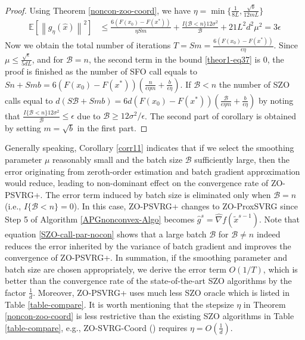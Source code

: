 \documentclass{article}
\newcommand*{\E}{\mathbb{E}}
\newcommand{\norm}[1]{\left\lVert#1\right\rVert}
\theoremstyle{definition}
\theoremstyle{remark}
\begin{document}
\begin{proof}
Using Theorem \ref{noncon-zoo-coord}, we have $\eta = \min\{\frac{1}{8L}, \frac{\sqrt{b}}{12mL}\}$
\begin{align}
\E[\norm{g_{\eta}(\hat{x})}^2] & \leq \frac{6\left(F(x_0) - F({x}^*)\right)}{\eta Sm} + \frac{I\{\mathcal{B} < n\}12 \sigma ^2}{\mathcal{B}}+21{L^2 d^2 \mu^2} = 3\epsilon\label{theor1-eq37}
 \end{align} 
 Now we obtain the total number of iterations   $T = Sm = \frac{6\left(F(x_0) - F({x}^*)\right)}{\epsilon\eta}$. Since $\mu \leq \frac{\sqrt{\epsilon}}{5{dL}}$, and for $\mathcal{B} = n$, the second term in the bound \eqref{theor1-eq37} is $0$, the proof is finished as the number of SFO call equals to $Sn+Smb = 6 \left(F(x_0) - F({x}^*)\right) (\frac{n}{\epsilon\eta m}+\frac{b}{\epsilon\eta})$. If  $\mathcal{B} < n$ the number of SZO calls equal to  $d(S\mathcal{B}+Smb) = 6d \left(F(x_0) - F({x}^*)\right) (\frac{\mathcal{\mathcal{B}}}{\epsilon\eta m}+\frac{b}{\epsilon\eta})$ by noting that $\frac{I\{\mathcal{B} < n\}12\sigma^2}{\mathcal{B}} \leq \epsilon$ due to $\mathcal{B} \geq 12\sigma^2 /\epsilon$. The second part of corollary is obtained by setting $m = \sqrt{b}$ in the first part.
\end{proof}
Generally speaking, Corollary \ref{corr11} indicates  that if we select the smoothing parameter $\mu$ reasonably small and the batch size $\mathcal{B}$ sufficiently large, then the error originating from zeroth-order estimation and batch gradient approximation would reduce, leading to non-dominant effect on the convergence rate of ZO-PSVRG+.
The error term induced by batch size  is eliminated only when $\mathcal{B} = n$  (i.e., $I\{\mathcal{B} < n\} = 0$). In
this case, ZO-PSVRG+ changes to ZO-ProxSVRG since Step 5 of Algorithm \ref{APGnonconvex-Algo} becomes $\hat{g}^s = \hat{\nabla} f(\tilde{x}^{s-1})$. Note that equation \eqref{SZO-call-par-nocon} shows that a large batch $\mathcal{B}$  for $\mathcal{B} \neq n$ indeed reduces the error inherited by the variance of batch gradient and improves the convergence of ZO-PSVRG+.  
In summation, if the smoothing parameter and batch size are chosen appropriately, we derive the error term $O(1/T)$, which is better than the convergence rate of the state-of-the-art SZO algorithms by the factor $\frac{1}{d}$. Moreover, ZO-PSVRG+ uses much less SZO oracle which is listed in Table \ref{table-compare}. It is worth mentioning that the stepsize $\eta$ in Theorem \ref{noncon-zoo-coord} is less restrictive than the existing SZO algorithms in Table \ref{table-compare}, e.g., ZO-SVRG-Coord (\cite{gu2018faster}) requires $\eta = O(\frac{1}{d})$. 
\end{document}
